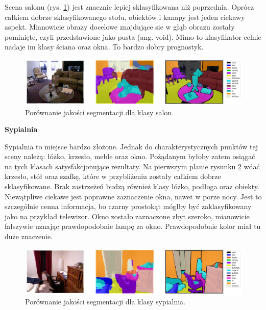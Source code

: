 Scena salonu (rys. \ref{fig:living_room-pred-3}) jest znacznie lepiej sklasyfikowana niż poprzednia. Oprócz całkiem dobrze sklasyfikowanego stołu, obiektów i kanapy jest jeden ciekawy aspekt. Mianowicie obrazy docelowe znajdujące sie w głąb obrazu zostały pominięte, czyli przedstawione jako pusta (ang. void). Mimo to klasyfikator celnie nadaje im klasy ściana oraz okna. To bardzo dobry prognostyk.

\begin{figure}[ht!]
    \centering
    \includegraphics[width=\textwidth]{img/preds_analysis/gt_vs_pred/living_room-3.png}
    \caption{Porównanie jakości segmentacji dla klasy salon.}
    \label{fig:living_room-pred-3}
\end{figure}

\noindent
\textbf{Sypialnia}

Sypialnia to miejsce bardzo złożone. Jednak do charakterystycznych punktów tej sceny należą: łóżko, krzesło, meble oraz okno. Pożądanym byłoby zatem osiągać na tych klasach satysfakcjonujące rezultaty. Na pierwszym planie rysunku \ref{fig:bedroom-pred-1} wdać krzesło, stół oraz szafkę, które w przybliżeniu zostały całkiem dobrze sklasyfikowane. Brak zastrzeżeń budzą również klasy łóżko, podłoga oraz obiekty. Niewątpliwe ciekawe jest poprawne zaznaczenie okna, nawet w porze nocy. Jest to szczególnie cenna informacja, bo czarny prostokąt mógłby być zaklasyfikowany jako na przykład telewizor. Okno zostało zaznaczone zbyt szeroko, mianowicie fałszywie uznając prawdopodobnie lampę za okno. Prawdopodobnie kolor miał tu duże znaczenie.

\begin{figure}[ht!]
    \centering
    \includegraphics[width=\textwidth]{img/preds_analysis/gt_vs_pred/bedroom-1.png}
    \caption{Porównanie jakości segmentacji dla klasy sypialnia.}
    \label{fig:bedroom-pred-1}
\end{figure}

